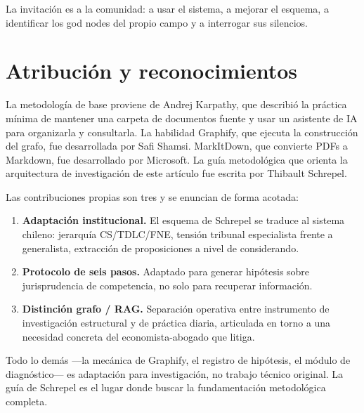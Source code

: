\documentclass[12pt,a4paper]{article}
\begin{document}
La invitación es a la comunidad: a usar el sistema, a mejorar el esquema, a
identificar los god nodes del propio campo y a interrogar sus silencios.

\section*{Atribución y reconocimientos}

La metodología de base proviene de Andrej Karpathy, que describió la práctica
mínima de mantener una carpeta de documentos fuente y usar un asistente de IA
para organizarla y consultarla.\autocite{spisak2026} La habilidad Graphify, que
ejecuta la construcción del grafo, fue desarrollada por Safi
Shamsi.\autocite{shamsi2025graphify} MarkItDown, que convierte PDFs a Markdown,
fue desarrollado por Microsoft.\autocite{microsoft2024markitdown} La guía
metodológica que orienta la arquitectura de investigación de este artículo fue
escrita por Thibault Schrepel.\autocite{schrepel2026brain}

Las contribuciones propias son tres y se enuncian de forma acotada:

\begin{enumerate}
  \item \textbf{Adaptación institucional.} El esquema de Schrepel se traduce al
    sistema chileno: jerarquía CS/TDLC/FNE, tensión tribunal especialista frente
    a generalista, extracción de proposiciones a nivel de considerando.
  \item \textbf{Protocolo de seis pasos.} Adaptado para generar hipótesis sobre
    jurisprudencia de competencia, no solo para recuperar información.
  \item \textbf{Distinción grafo / RAG.} Separación operativa entre instrumento
    de investigación estructural y de práctica diaria, articulada en torno a
    una necesidad concreta del economista-abogado que litiga.
\end{enumerate}

Todo lo demás —la mecánica de Graphify, el registro de hipótesis, el módulo de
diagnóstico— es adaptación para investigación, no trabajo técnico original. La
guía de Schrepel es el lugar donde buscar la fundamentación metodológica completa.

\end{document}
